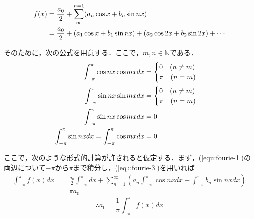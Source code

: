 \documentclass[11pt,a4paper]{jsarticle}
\theoremstyle{definition}
\begin{document}
\begin{align}
  f(x) & = \frac{a_0}{2} + \sum_{\infty}^{n=1} (a_n \cos x + b_n \sin nx)                       \label{equ:fourie-1} \\
       & = \frac{a_0}{2} + (a_1 \cos x + b_1 \sin nx) + (a_2 \cos 2x + b_2 \sin 2x) + \cdots \notag
\end{align}

そのために，次の公式を用意する．ここで，$m,n\in \mathbb{N}$である．
\begin{align}
  \int_{-\pi}^{\pi} \cos nx \cos mx dx                        & = \begin{cases}
                                                                    0 \quad (n\neq m) \\
                                                                    \pi \quad (n=m)
                                                                  \end{cases} \notag       \\
  \int_{-\pi}^{\pi} \sin nx \sin mx dx                        & = \begin{cases}
                                                                    0 \quad (n\neq m) \\
                                                                    \pi \quad (n=m)   \\
                                                                  \end{cases} \notag       \\
  \int_{-\pi}^{\pi} \sin nx \cos mx dx                        & = 0   \label{equ:fourie-2} \\
  \int_{-\pi}^{\pi} \sin nx dx = \int_{-\pi}^{\pi} \cos mx dx & = 0 \label{equ:fourie-3}
\end{align}

ここで，次のような形式的計算が許されると仮定する．まず，(\ref{equ:fourie-1})の両辺について$-\pi$から$\pi$まで積分し，(\ref{equ:fourie-3})を用いれば
\begin{align*}
  \int_{-\pi}^{\pi} f(x)dx & = \frac{a_0}{2}\int_{-\pi}^{\pi} dx + \sum_{n=1}^{\infty} (a_n \int_{-\pi}^{\pi}\cos nx dx+ \int_{-\pi}^{\pi}b_n \sin nx dx) \\
                           & = \pi a_0
\end{align*}
\begin{equation}
  \label{equ:fourie-a0}
  \therefore a_0 = \frac{1}{\pi}\int_{-\pi}^{\pi} f(x) dx
\end{equation}
\end{document}
